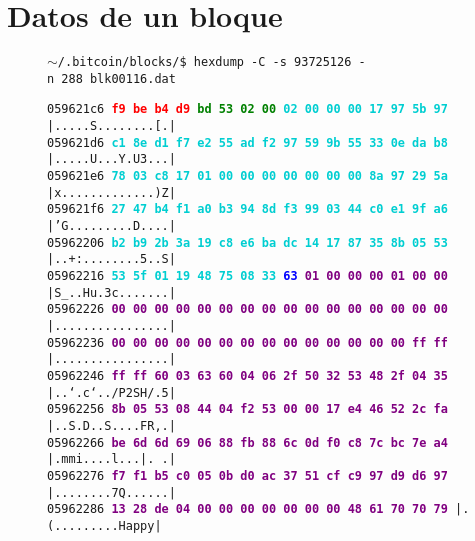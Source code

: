 \documentclass{article}
\begin{document}
\section{Datos de un bloque}
\begin{figure}[H]
\scriptsize{\texttt{$\sim$/.bitcoin/blocks/\$ hexdump\ -C\ -s\ 93725126\ -n\ 288\ blk00116.dat}}
    
    \scriptsize{
    \texttt{059621c6  \textbf{\textcolor{red}{f9 be b4 d9} \textcolor{green}{bd 53 02 00}  \textcolor{darkTurquoise}{02 00 00 00 17 97 5b 97}}  |.....S........[.|} \\
    \texttt{059621d6  \textbf{\textcolor{darkTurquoise}{c1 8e d1 f7 e2 55 ad f2  97 59 9b 55 33 0e da b8}}  |.....U...Y.U3...|} \\
    \texttt{059621e6  \textbf{\textcolor{darkTurquoise}{78 03 c8 17 01 00 00 00  00 00 00 00 8a 97 29 5a}}  |x.............)Z|} \\
    \texttt{059621f6  \textbf{\textcolor{darkTurquoise}{27 47 b4 f1 a0 b3 94 8d  f3 99 03 44 c0 e1 9f a6}}  |'G.........D....|} \\
    \texttt{05962206  \textbf{\textcolor{darkTurquoise}{b2 b9 2b 3a 19 c8 e6 ba  dc 14 17 87 35 8b 05 53}}  |..+:........5..S|} \\
    \texttt{05962216  \textbf{\textcolor{darkTurquoise}{53 5f 01 19 48 75 08 33}  \textcolor{blue}{63} \textcolor{purple}{01 00 00 00 01 00 00}}  |S\_..Hu.3c.......|} \\
    \texttt{05962226 \textbf{\textcolor{purple}{00 00 00 00 00 00 00 00  00 00 00 00 00 00 00 00}} |................|} \\
    \texttt{05962236 \textbf{\textcolor{purple}{00 00 00 00 00 00 00 00  00 00 00 00 00 00 ff ff}} |................|} \\
    \texttt{05962246 \textbf{\textcolor{purple}{ff ff 60 03 63 60 04 06  2f 50 32 53 48 2f 04 35}} |..`.c`../P2SH/.5|} \\
    \texttt{05962256 \textbf{\textcolor{purple}{8b 05 53 08 44 04 f2 53  00 00 17 e4 46 52 2c fa}} |..S.D..S....FR,.|} \\
    \texttt{05962266 \textbf{\textcolor{purple}{be 6d 6d 69 06 88 fb 88  6c 0d f0 c8 7c bc 7e a4}} |.mmi....l...|.~.|} \\
    \texttt{05962276 \textbf{\textcolor{purple}{f7 f1 b5 c0 05 0b d0 ac  37 51 cf c9 97 d9 d6 97}} |........7Q......|} \\
    \texttt{05962286 \textbf{\textcolor{purple}{13 28 de 04 00 00 00 00  00 00 00 48 61 70 70 79}} |.(.........Happy|} \\
}
\end{figure}
\end{document}
